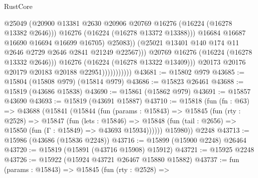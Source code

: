 \begin{lexlean}{RustCore}
\begin{coremodule}
                                          @25049
                                          (@20900
                                            @13381
                                            @2630
                                            @20906
                                            @20769
                                            @16276
                                            (@16224 (@16278 @13382 @2646)))
                                          @16276
                                          (@16224 (@16278 @13372 @13388)))
                                        @16684
                                        @16687
                                        @16690
                                        @16694
                                        @16699
                                        @16705)
                                      @25083))
                                  (@25021
                                    @13401
                                    @140
                                    @174
                                    @11
                                    @2646
                                    @2729
                                    @2646
                                    @2841
                                    @21249
                                    @22567)))
                              @20769
                              @16276
                              (@16224 (@16278 @13332 @2646)))
                            @16276
                            (@16224 (@16278 @13322 @13409)))
                          @20173
                          @20176
                          @20179
                          @20183
                          @20188
                          @22951)))))))))))
@43681 := @15802 @979
@43685 := @15804 (@15808 @979) (@15814 @979)
@43686 := @15823 @26461
@43688 := @15819 (@43686 @15838)
@43690 := @15861 (@15862 @979)
@43691 := @15857 @43690
@43693 := @15819 (@43691 @15887)
@43710 := @15818
    (fun (fn : @63) =>
    @43688
      (@15841
        (@15844
          (fun (params : @15843) =>
          @15845
            (fun (rty : @2528) =>
            @15847
              (fun (lets : @15846) =>
              @15848 (fun (tail : @2656) => @15850 (fun (Γ : @15849) => @43693 @15934))))))
        @15980))
    @2248
@43713 := @15986 (@43686 (@15836 @2248))
@43716 := @15899 (@15900 @2248) @26464
@43720 := @15819 (@15891 (@43716 @15908) @15912)
@43721 := @15925 @2248
@43726 := @15922 (@15924 @43721 @26467 @15880 @15882)
@43737 := fun (params : @15843) =>
  @15845
    (fun (rty : @2528) =>

\end{coremodule}
\end{lexlean}

